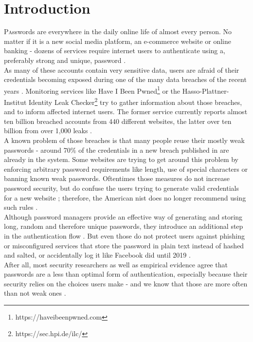
\section{Introduction}
\label{sec:intro}

\lettrine[nindent=0em,lines=3]{P}asswords are everywhere in the daily online life of almost every person. No matter if it is a new social media platform, an e-commerce website or online banking - dozens of services require internet users to authenticate using a, preferably strong and unique, password \cite{nist}.\\
As many of these accounts contain very sensitive data, users are afraid of their credentials becoming exposed during one of the many data breaches of the recent years \cite{statista_dossier2018}. Monitoring services like Have I Been Pwned\footnote{https://haveibeenpwned.com} or the Hasso-Plattner-Institut Identity Leak Checker\footnote{https://sec.hpi.de/ilc/} try to gather information about those breaches, and to inform affected internet users. The former service currently reports almost ten billion breached accounts from 440 different websites, the latter over ten billion from over 1,000 leaks \cite{hibp,hpi}.\\
A known problem of those breaches is that many people reuse their mostly weak passwords \cite{bailey2014} - around 70\% of the credentials in a new breach published in \cite{hibp} are already in the system. Some websites are trying to get around this problem by enforcing arbitrary password requirements like length, use of special characters or banning known weak passwords. Oftentimes those measures do not increase password security, but do confuse the users trying to generate valid credentials for a new website \cite{hunt2017}; therefore, the American \ac{nist} does no longer recommend using such rules \cite{nist}.\\
Although password managers provide an effective way of generating and storing long, random and therefore unique passwords, they introduce an additional step in the authentication flow \cite{lyastani2018}.
But even those do not protect users against phishing or misconfigured services that store the password in plain text instead of hashed and salted, or accidentally log it like Facebook did until 2019 \cite{gallagher2019}.\\
After all, most security researchers as well as empirical evidence agree that passwords are a less than optimal form of authentication, especially because their security relies on the choices users make - and we know that those are more often than not weak ones \cite{hunt2018c,whitty2015}.\\
